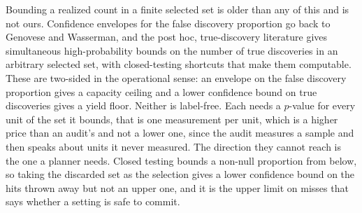 \documentclass[twocolumn,10pt]{article}
\begin{document}
Bounding a realized count in a finite selected set is older than any of this and is not ours.
Confidence envelopes for the false discovery proportion go back to Genovese and
Wasserman,\citep{GenoveseWasserman2004} and the post hoc, true-discovery literature gives
simultaneous high-probability bounds on the number of true discoveries in an arbitrary selected
set, with closed-testing shortcuts that make them
computable.\citep{Goeman2011Exploratory,Goeman2019Simultaneous,Katsevich2020FDP,Blanchard2020PostHoc}
These are two-sided in the operational sense: an envelope on the false discovery proportion
gives a capacity ceiling and a lower confidence bound on true discoveries gives a yield floor.
Neither is label-free. Each needs a $p$-value for every unit of the set it bounds, that
is one measurement per unit, which is a higher price than an audit's and not a lower one, since
the audit measures a sample and then speaks about units it never measured. The direction they
cannot reach is the one a planner needs. Closed testing bounds a non-null proportion from
below, so taking the discarded set as the selection gives a lower confidence bound on the hits
thrown away but not an upper one, and it is the upper limit on misses that says whether a setting is safe to commit.
\end{document}
